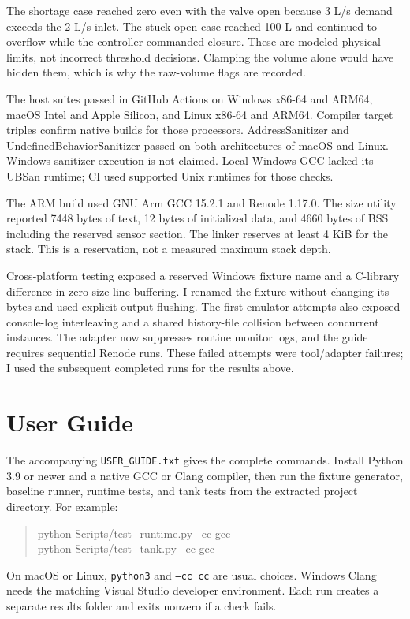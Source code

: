 \documentclass[conference]{IEEEtran}
\begin{document}
The shortage case reached zero even with the valve open because 3 L/s demand exceeds the 2 L/s inlet. The stuck-open case reached 100 L and continued to overflow while the controller commanded closure. These are modeled physical limits, not incorrect threshold decisions. Clamping the volume alone would have hidden them, which is why the raw-volume flags are recorded.

The host suites passed in GitHub Actions on Windows x86-64 and ARM64, macOS Intel and Apple Silicon, and Linux x86-64 and ARM64. Compiler target triples confirm native builds for those processors. AddressSanitizer and UndefinedBehaviorSanitizer passed on both architectures of macOS and Linux. Windows sanitizer execution is not claimed. Local Windows GCC lacked its UBSan runtime; CI used supported Unix runtimes for those checks.

The ARM build used GNU Arm GCC 15.2.1 and Renode 1.17.0. The size utility reported 7448 bytes of text, 12 bytes of initialized data, and 4660 bytes of BSS including the reserved sensor section. The linker reserves at least 4 KiB for the stack. This is a reservation, not a measured maximum stack depth.

Cross-platform testing exposed a reserved Windows fixture name and a C-library difference in zero-size line buffering. I renamed the fixture without changing its bytes and used explicit output flushing. The first emulator attempts also exposed console-log interleaving and a shared history-file collision between concurrent instances. The adapter now suppresses routine monitor logs, and the guide requires sequential Renode runs. These failed attempts were tool/adapter failures; I used the subsequent completed runs for the results above.

\section{User Guide}
The accompanying \texttt{USER\_GUIDE.txt} gives the complete commands. Install Python 3.9 or newer and a native GCC or Clang compiler, then run the fixture generator, baseline runner, runtime tests, and tank tests from the extracted project directory. For example:
\begin{quote}\small\ttfamily
python Scripts/test\_runtime.py --cc gcc\\
python Scripts/test\_tank.py --cc gcc
\end{quote}
On macOS or Linux, \texttt{python3} and \texttt{--cc cc} are usual choices. Windows Clang needs the matching Visual Studio developer environment. Each run creates a separate results folder and exits nonzero if a check fails.
\end{document}
